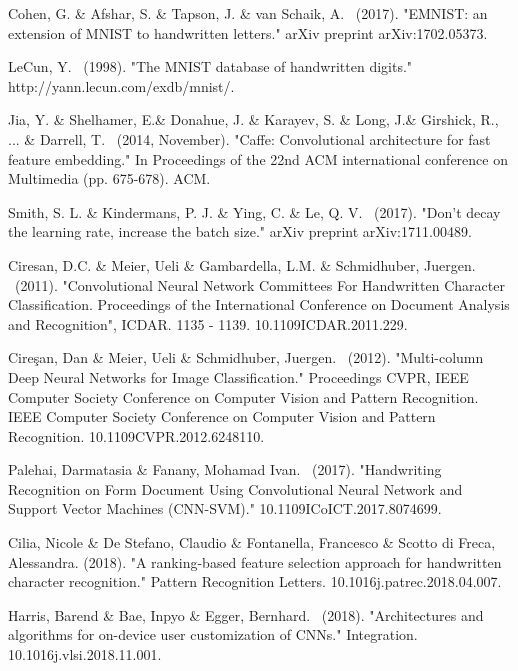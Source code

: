 \documentclass{article}
\begin{document}
\begin{thebibliography}{99}
   Cohen, G. \& Afshar, S. \& Tapson, J. \& van Schaik, A. \ (2017). "EMNIST: an extension of MNIST to handwritten letters." arXiv preprint arXiv:1702.05373.

   LeCun, Y. \ (1998). "The MNIST database of handwritten digits." http://yann.lecun.com/exdb/mnist/.

   Jia, Y. \& Shelhamer, E.\& Donahue, J. \& Karayev, S. \& Long, J.\& Girshick, R., ... \& Darrell, T. \ (2014, November). "Caffe: Convolutional architecture for fast feature embedding." In Proceedings of the 22nd ACM international conference on Multimedia (pp. 675-678). ACM.

   Smith, S. L. \& Kindermans, P. J. \& Ying, C. \& Le, Q. V. \ (2017). "Don't decay the learning rate, increase the batch size." arXiv preprint arXiv:1711.00489.

   Ciresan, D.C. \& Meier, Ueli \& Gambardella, L.M. \& Schmidhuber, Juergen. \ (2011). "Convolutional Neural Network Committees For Handwritten Character Classification. Proceedings of the International Conference on Document Analysis and Recognition", ICDAR. 1135 - 1139. 10.1109\/ICDAR.2011.229.

   Cireşan, Dan \& Meier, Ueli \& Schmidhuber, Juergen. \ (2012). "Multi-column Deep Neural Networks for Image Classification." Proceedings  CVPR, IEEE Computer Society Conference on Computer Vision and Pattern Recognition. IEEE Computer Society Conference on Computer Vision and Pattern Recognition. 10.1109\/CVPR.2012.6248110.

   Palehai, Darmatasia \& Fanany, Mohamad Ivan. \ (2017). "Handwriting Recognition on Form Document Using Convolutional Neural Network and Support Vector Machines (CNN-SVM)." 10.1109\/ICoICT.2017.8074699.

   Cilia, Nicole \& De Stefano, Claudio \& Fontanella, Francesco \& Scotto di Freca, Alessandra. (2018). "A ranking-based feature selection approach for handwritten character recognition." Pattern Recognition Letters. 10.1016\/j.patrec.2018.04.007.

   Harris, Barend \& Bae, Inpyo \& Egger, Bernhard. \ (2018). "Architectures and algorithms for on-device user customization of CNNs." Integration. 10.1016\/j.vlsi.2018.11.001.


\end{thebibliography}
\end{document}
